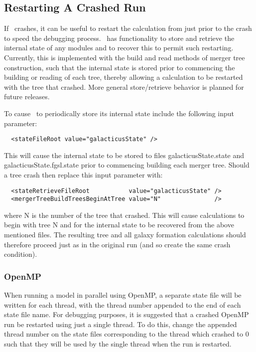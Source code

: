 \subsection{Restarting A Crashed Run}\label{sec:Restarting}

If \glc\ crashes, it can be useful to restart the calculation from just prior to the crash to speed the debugging process. \glc\ has functionality to store and retrieve the internal state of any modules and to recover this to permit such restarting. Currently, this is implemented with the {\normalfont \ttfamily build} and {\normalfont \ttfamily read} methods of merger tree construction, such that the internal state is stored prior to commencing the building or reading of each tree, thereby allowing a calculation to be restarted with the tree that crashed. More general store/retrieve behavior is planned for future releases.

To cause \glc\ to periodically store its internal state include the following input parameter:
\begin{verbatim}
  <stateFileRoot value="galacticusState" />
\end{verbatim}
This will cause the internal state to be stored to files {\normalfont \ttfamily galacticusState.state} and {\normalfont \ttfamily galacticusState.fgsl.state} prior to commencing building each merger tree. Should a tree crash then replace this input parameter with:
\begin{verbatim}
  <stateRetrieveFileRoot           value="galacticusState" />
  <mergerTreeBuildTreesBeginAtTree value="N"               />
\end{verbatim}
where {\normalfont \ttfamily N} is the number of the tree that crashed. This will cause calculations to begin with tree {\normalfont \ttfamily N} and for the internal state to be recovered from the above mentioned files. The resulting tree and all galaxy formation calculations should therefore proceed just as in the original run (and so create the same crash condition).

\subsubsection{OpenMP}

When running a model in parallel using OpenMP, a separate state file will be written for each thread, with the thread number appended to the end of each state file name. For debugging purposes, it is suggested that a crashed OpenMP run be restarted using just a single thread. To do this, change the appended thread number on the state files corresponding to the thread which crashed to 0 such that they will be used by the single thread when the run is restarted.

